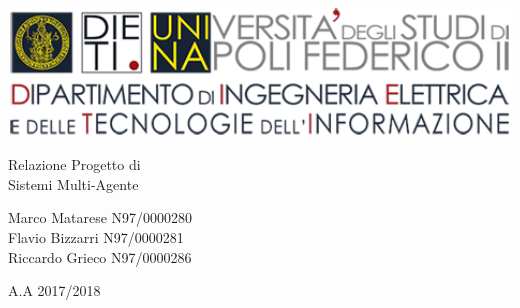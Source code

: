 
\thispagestyle{empty}

\begin{center}
	\includegraphics[width=1\textwidth]{DIETI}
	
	\par\bigskip\par\bigskip\par\bigskip\par\bigskip\par\bigskip\par\bigskip\par\bigskip\par	%
	
	{\huge Relazione Progetto di\\}
	{\huge Sistemi Multi-Agente\\}
	
	\par\bigskip\par\bigskip\par\bigskip\par\bigskip\par\bigskip\par\bigskip\par\bigskip\par	%
	
	{\LARGE Marco Matarese N97/0000280\\}
	{\LARGE Flavio Bizzarri N97/0000281\\}
	{\LARGE Riccardo Grieco N97/0000286\\}
	
	\par\bigskip\par\bigskip\par\bigskip\par\bigskip\par\bigskip\par\bigskip	%
	
	{\large A.A 2017/2018\par}
	
\end{center}

